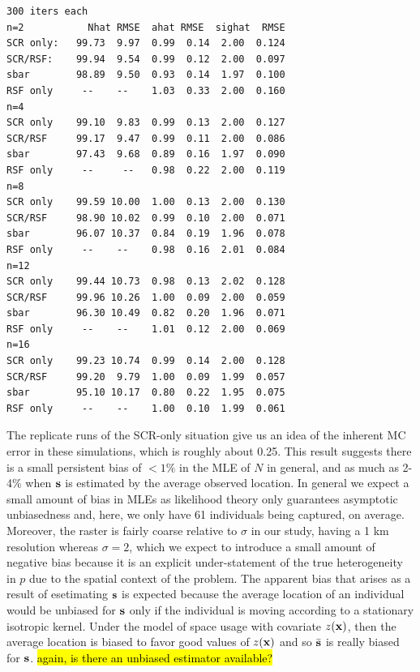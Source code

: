 \begin{verbatim}
300 iters each
n=2           Nhat RMSE  ahat RMSE  sighat  RMSE
SCR only:   99.73  9.97  0.99  0.14  2.00  0.124
SCR/RSF:    99.94  9.54  0.99  0.12  2.00  0.097
sbar        98.89  9.50  0.93  0.14  1.97  0.100
RSF only     --    --    1.03  0.33  2.00  0.160
n=4
SCR only    99.10  9.83  0.99  0.13  2.00  0.127
SCR/RSF     99.17  9.47  0.99  0.11  2.00  0.086
sbar        97.43  9.68  0.89  0.16  1.97  0.090
RSF only     --     --   0.98  0.22  2.00  0.119
n=8
SCR only    99.59 10.00  1.00  0.13  2.00  0.130
SCR/RSF     98.90 10.02  0.99  0.10  2.00  0.071
sbar        96.07 10.37  0.84  0.19  1.96  0.078
RSF only     --    --    0.98  0.16  2.01  0.084
n=12
SCR only    99.44 10.73  0.98  0.13  2.02  0.128
SCR/RSF     99.96 10.26  1.00  0.09  2.00  0.059
sbar        96.30 10.49  0.82  0.20  1.96  0.071
RSF only     --    --    1.01  0.12  2.00  0.069
n=16
SCR only    99.23 10.74  0.99  0.14  2.00  0.128
SCR/RSF     99.20  9.79  1.00  0.09  1.99  0.057
sbar        95.10 10.17  0.80  0.22  1.95  0.075
RSF only     --    --    1.00  0.10  1.99  0.061
\end{verbatim}

The replicate runs of the SCR-only situation give us an idea of the
inherent MC error in these simulations, which is roughly about
0.25. This result suggests there is a small persistent bias of $< 1\%$
in the MLE of $N$ in general, and as much as 2-4\% when ${\bf s}$ is
estimated by the average observed location.  In general we expect a
small amount of bias in MLEs as likelihood theory only guarantees
asymptotic unbiasedness and, here, we only have 61 individuals being
captured, on average.  Moreover, the raster is fairly coarse relative
to $\sigma$ in our study, having a 1 km resolution whereas $\sigma =
2$, which we expect to introduce a small amount of negative bias
because it is an explicit under-statement of the true heterogeneity in
$p$ due to the spatial context of the problem.  The apparent bias that
arises as a result of esetimating ${\bf s}$ is expected because the
average location of an individual would be unbiased for ${\bf s}$ only
if the individual is moving according to a stationary isotropic
kernel. Under the model of space usage with covariate $z({\bf x})$,
then the average location is biased to favor good values of $z({\bf
  x})$ and so $\bar{\bf s}$ is really biased for ${\bf s}$. \hl{again,
  is there an unbiased estimator available?}

